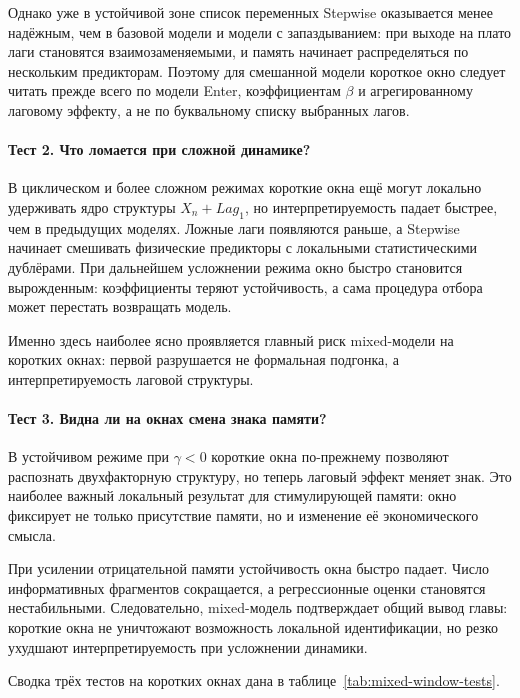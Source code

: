 Однако уже в устойчивой зоне список переменных Stepwise оказывается менее надёжным, чем в базовой модели и модели с запаздыванием: при выходе на плато лаги становятся взаимозаменяемыми, и память начинает распределяться по нескольким предикторам. Поэтому для смешанной модели короткое окно следует читать прежде всего по модели Enter, коэффициентам \(\beta\) и агрегированному лаговому эффекту, а не по буквальному списку выбранных лагов.

\paragraph*{Тест 2. Что ломается при сложной динамике?}
\label{sec:test-2-chto-lomaetsya-pri-slozhnoi-dinamike}

В циклическом и более сложном режимах короткие окна ещё могут локально удерживать ядро структуры \(X_n + Lag_1\), но интерпретируемость падает быстрее, чем в предыдущих моделях. Ложные лаги появляются раньше, а Stepwise начинает смешивать физические предикторы с локальными статистическими дублёрами. При дальнейшем усложнении режима окно быстро становится вырожденным: коэффициенты теряют устойчивость, а сама процедура отбора может перестать возвращать модель.

Именно здесь наиболее ясно проявляется главный риск mixed-модели на коротких окнах: первой разрушается не формальная подгонка, а интерпретируемость лаговой структуры.

\paragraph*{Тест 3. Видна ли на окнах смена знака памяти?}
\label{sec:test-3-vidna-li-na-oknah-smena-znaka-pamyati}

В устойчивом режиме при \(\gamma<0\) короткие окна по-прежнему позволяют распознать двухфакторную структуру, но теперь лаговый эффект меняет знак. Это наиболее важный локальный результат для стимулирующей памяти: окно фиксирует не только присутствие памяти, но и изменение её экономического смысла.

При усилении отрицательной памяти устойчивость окна быстро падает. Число информативных фрагментов сокращается, а регрессионные оценки становятся нестабильными. Следовательно, mixed-модель подтверждает общий вывод главы: короткие окна не уничтожают возможность локальной идентификации, но резко ухудшают интерпретируемость при усложнении динамики.

Сводка трёх тестов на коротких окнах дана в таблице~\ref{tab:mixed-window-tests}.

